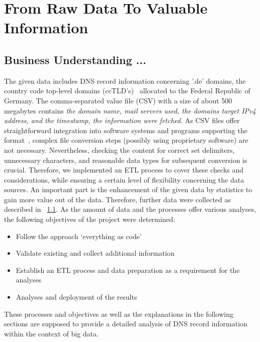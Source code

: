 \section{From Raw Data To Valuable Information}\label{sec:from-raw-data-to-valuable-information}

\subsection{Business Understanding ...}\label{subsec:businessunderstanding}
The given data includes DNS record information concerning '.de' domains, the country code top-level domains (ccTLD's)~\autocite[cf.][]{DENICeG.2021} allocated to the Federal Republic of Germany.
The comma-separated value file (CSV) with a size of about 500 megabytes contains \textit{the domain name, mail servers used, the domains target IPv4 address, and the timestamp, the information were fetched}.
As CSV files offer straightforward integration into software systems and programs supporting the format~\autocite[cf.][]{Hoffman.2018}, complex file conversion steps (possibly using proprietary software) are not necessary.
Nevertheless, checking the content for correct set delimiters, unnecessary characters, and reasonable data types for subsequent conversion is crucial.
Therefore, we implemented an ETL process to cover these checks and considerations, while ensuring a certain level of flexibility concerning the data sources.
An important part is the enhancement of the given data by statistics to gain more value out of the data.
Therefore, further data were collected as described in ~\ref{subsec:businessunderstanding}.
As the amount of data and the processes offer various analyses, the following objectives of the project were determined:
\begin{itemize}
    \item Follow the approach ‘everything as code’
    \item Validate existing and collect additional information
    \item Establish an ETL process and data preparation as a requirement for the analyses
    \item Analyses and deployment of the results
\end{itemize}
These processes and objectives as well as the explanations in the following sections are supposed to provide a detailed analysis of DNS record information within the context of big data.



